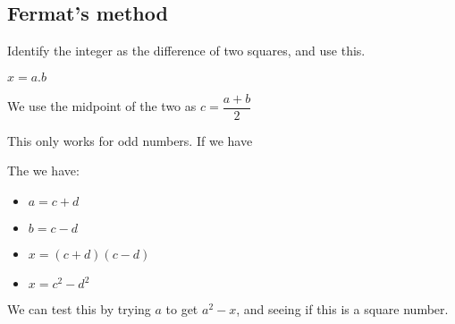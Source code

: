 
\subsection{Fermat's method}

Identify the integer as the difference of two squares, and use this.

\(x=a.b\)

We use the midpoint of the two as \(c=\dfrac{a+b}{2}\)

This only works for odd numbers. If we have

The we have:

\begin{itemize}
\item \(a=c+d\)
\item \(b=c-d\)
\item \(x=(c+d)(c-d)\)
\item \(x=c^2-d^2\)
\end{itemize}

We can test this by trying \(a\) to get \(a^2-x\), and seeing if this is a square number.

